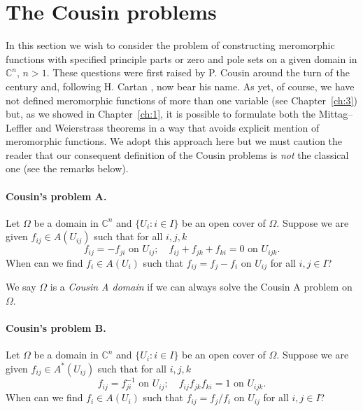 \section{The Cousin problems}\label{sec:2:7}
In this section we wish to consider the problem of constructing meromorphic functions with specified principle parts or zero and pole sets on a given domain in $\mathbb C^n$, $n>1$. These questions were first raised by P. Cousin around the turn of the century and, following H. Cartan \cite{bib:I:cartan-h:1}, now bear his name. As yet, of course, we have not defined meromorphic functions of more than one variable (see Chapter~\ref{ch:3}) but, as we showed in Chapter~\ref{ch:1}, it is possible to formulate both the Mittag--Leffler and Weierstrass theorems in a way that avoids explicit mention of meromorphic functions. We adopt this approach here but we must caution the reader that our consequent definition of the Cousin problems is \emph{not} the classical one (see the remarks below).
\paragraph*{Cousin's problem A.}
Let $\Omega$ be a domain in $\mathbb C^n$ and $\{U_i:i\in I\}$ be an open cover of $\Omega$. Suppose we are given $f_{ij}\in A(U_{ij})$ such that for all $i,j,k$
\[f_{ij}=-f_{ji}\text{ on }U_{ij};\quad f_{ij}+f_{jk}+f_{ki}=0\text{ on }U_{ijk}.\]
When can we find $f_i\in A(U_i)$ such that $f_{ij}=f_j-f_i$ on $U_{ij}$ for all $i,j\in I$?

We say $\Omega$ is a \emph{Cousin A domain} if we can always solve the Cousin A problem on $\Omega$.
\paragraph*{Cousin's problem B.}
Let $\Omega$ be a domain in $\mathbb C^n$ and $\{U_i:i\in I\}$ be an open cover of $\Omega$. Suppose we are given $f_{ij}\in A^*(U_{ij})$ such that for all $i,j,k$
\[f_{ij}=f_{ji}^{-1}\text{ on }U_{ij};\quad f_{ij}f_{jk}f_{ki}=1\text{ on }U_{ijk}.\]
When can we find $f_i\in A(U_i)$ such that $f_{ij}=f_j/f_i$ on $U_{ij}$ for all $i,j\in I$?

